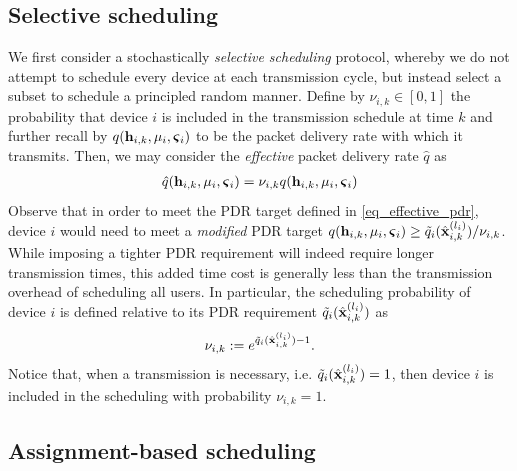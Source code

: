 \subsection{Selective scheduling}\label{sec_rss}
We first consider a stochastically \emph{selective scheduling} protocol, whereby we do not attempt to schedule every device at each transmission cycle, but instead select a subset to schedule a principled random manner. Define by $\nu_{i,k} \in [0,1]$ the probability that device $i$ is included in the transmission schedule at time $k$ and further recall by $q({\mathbf h}_{i,k},\mu_i,\boldsymbol{\varsigma}_i)$ to be the packet delivery rate with which it transmits. Then, we may consider the \emph{effective} packet delivery rate $\hat{q}$ as 
%
\begin{align}\label{eq_effective_pdr}
\hat{q}({\mathbf h}_{i,k},\mu_i,\boldsymbol{\varsigma}_i) = \nu_{i,k} q({\mathbf h}_{i,k},\mu_i,\boldsymbol{\varsigma}_i)
\end{align}
%
Observe that in order to meet the PDR target defined in \eqref{eq_effective_pdr}, device $i$ would need to meet a \emph{modified} PDR  target $q({\mathbf h}_{i,k},\mu_i,\boldsymbol{\varsigma}_i) \geq {\ensuremath{\tilde q}}_i({\hat{\mathbf x} }^{(l_i)}_{i,k})/\nu_{i,k}$. While imposing a tighter PDR requirement will indeed require longer transmission times, this added time cost is generally less than the transmission overhead of scheduling all users. In particular, the scheduling probability of device $i$ is defined relative to its PDR requirement ${\tilde q}_i({\hat{\mathbf x} }^{(l_i)}_{i,k})$ as 
%
\begin{align}\label{eq_prob_c}
\nu_{i,k} := e^{{\tilde q}_i({\hat{\mathbf x} }^{(l_i)}_{i,k})-1} .
\end{align}
%
Notice that, when a transmission is necessary, i.e. ${\tilde q}_i({\hat{\mathbf x} }^{(l_i)}_{i,k}) = 1$, then device $i$ is included in the scheduling with probability $\nu_{i,k} = 1$.



\subsection{Assignment-based scheduling}\label{sec_assignment}


